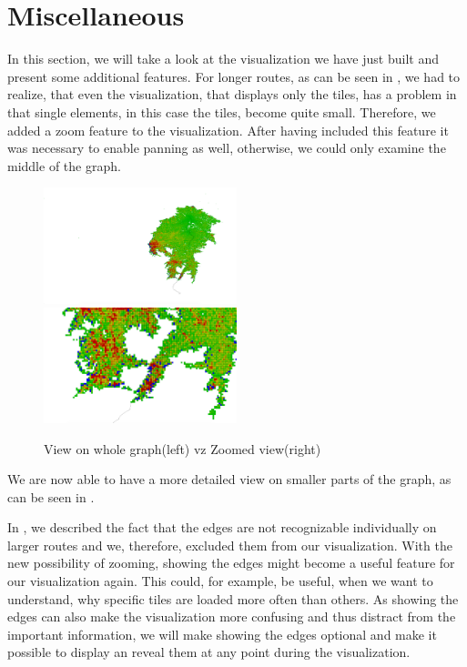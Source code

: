 \documentclass
[
    paper = a4,
    pagesize,
    12 pt,
    twoside,                       %
    open = right,
    DIV = calc,
    BCOR = 0 mm,                   %
    bibtotoc
]
{scrbook}
\begin{document}
\section{Miscellaneous}

In this section, we will take a look at the visualization we have just built and present some additional features.
For longer routes, as can be seen in , we had to realize, that even the visualization, that displays only the tiles, has a problem in that single elements, in this case the tiles, become quite small.
Therefore, we added a zoom feature to the visualization.
After having included this feature it was necessary to enable panning as well, otherwise, we could only examine the middle of the graph.

\begin{figure}
    \includegraphics[width=0.5\textwidth]{Images/vis-zoom-small.png}
    \includegraphics[width=0.5\textwidth]{Images/vis-zoom-large.png}
\caption[]{View on whole graph(left) vz Zoomed view(right)}
\label{fig:zoom}
\end{figure}

We are now able to have a more detailed view on smaller parts of the graph, as can be seen in .

In , we described the fact that the edges are not recognizable individually on larger routes and we, therefore, excluded them from our visualization.
With the new possibility of zooming, showing the edges might become a useful feature for our visualization again.
This could, for example, be useful, when we want to understand, why specific tiles are loaded more often than others.
As showing the edges can also make the visualization more confusing and thus distract from the important information, we will make showing the edges optional and make it possible to display an reveal them at any point during the visualization.
\end{document}
